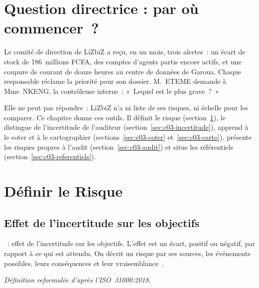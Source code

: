 \bigskip

\section*{Question directrice : par où commencer~?}

Le comité de direction de LiZbiZ a reçu, en un mois, trois alertes~: un écart
de stock de 186~millions FCFA, des comptes d'agents partis encore actifs,
et une coupure de courant de douze heures au centre de données de Garoua.
Chaque responsable réclame la priorité pour son dossier. M.~ETEME demande à
Mme~NKENG, la contrôleuse interne~: «~Lequel est le plus grave~?~»

Elle ne peut pas répondre~: LiZbiZ n'a ni liste de ses risques, ni échelle
pour les comparer. Ce chapitre donne ces outils. Il définit le risque
(section~\ref{sec:c03-definir}), le distingue de l'incertitude de
l'auditeur (section~\ref{sec:c03-incertitude}), apprend à le coter et à le
cartographier (sections~\ref{sec:c03-coter} et~\ref{sec:c03-carto}),
présente les risques propres à l'audit (section~\ref{sec:c03-audit}) et
situe les référentiels (section~\ref{sec:c03-referentiels}).

\separateur

\section{Définir le Risque}
\label{sec:c03-definir}

\subsection{Effet de l'incertitude sur les objectifs}

\begin{boxdef}
~: effet de l'incertitude sur les objectifs.
L'effet est un écart, positif ou négatif, par rapport à ce qui est attendu.
On décrit un risque par ses sources, les événements possibles, leurs
conséquences et leur vraisemblance~\cite{iso31000_2018}.
\end{boxdef}
{\small\itshape Définition reformulée d'après l'ISO~31000:2018.}

